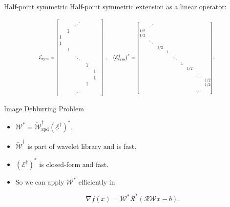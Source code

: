\documentclass[xcolor=dvipsnames,t]{beamer} %
\newcommand\scalemath[2]{\scalebox{#1}{\mbox{\ensuremath{\displaystyle #2}}}}
\begin{document}
\begin{frame}{Half-point symmetric}
   Half-point symmetric extension as a linear operator:

\[ \scalemath{0.75}{\mathcal{E}_\text{sym} = \begin{bmatrix} & & \iddots & & &\\ & 1 &&&&\\ 1&&&&&\\1&&&&\\&1&&&&\\&&\ddots&&&\\&&&1&\\&&&&1\\&&&&1\\&&&1&\\&&\iddots&&\end{bmatrix}, \quad \left(\mathcal{E}_\text{sym}^\dagger\right)^\ast = \scalemath{0.75}{\begin{bmatrix} & \iddots \\ 1/2&&&&&\\1/2&&&&\\&\ddots&&&&&&\\&&1/2&\\&&&1\\&&&&\ddots\\&&&&&1\\&&&&&&1/2\\&&&&&&&\ddots\\&&&&&&&&1/2\\&&&&&&&&1/2\\&&&&&&&\iddots\\\end{bmatrix}}}. \]

\end{frame}

\begin{frame}{Image Deblurring Problem}
   \begin{itemize}
      \item $\mathcal{W}^\ast = \tilde{\mathcal{W}}_\text{zpd}^\dagger(\mathcal{E}^\dagger)^\ast$.
      \item $\tilde{\mathcal{W}}^\dagger$ is part of wavelet library and is fast.
      \item $(\mathcal{E}^\dagger)^\ast$ is closed-form and fast.
      \item So we can apply $\mathcal{W}^\ast$ efficiently in

         \[ \nabla f(x) = \mathcal{W}^\ast\mathcal{R}^\ast\left(\mathcal{RW}x-b\right). \] 
   \end{itemize}
\end{frame}
\end{document}
